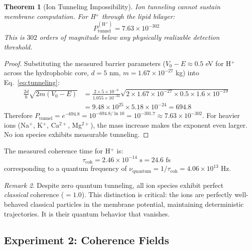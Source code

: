 \documentclass[twocolumn,10pt,a4paper]{article}
\newtheorem{theorem}{Theorem}[section]
\theoremstyle{definition}
\theoremstyle{remark}
\newtheorem{remark}[theorem]{Remark}
\begin{document}
\begin{theorem}[Ion Tunneling Impossibility]
\label{thm:tunneling}
Ion tunneling cannot sustain membrane computation. For H$^+$ through the lipid bilayer:
\begin{equation}
\label{eq:tunneling_result}
P_{\mathrm{tunnel}}^{(\mathrm{H}^+)} = 7.63 \times 10^{-302}
\end{equation}
This is $302$ orders of magnitude below any physically realizable detection threshold.
\end{theorem}

\begin{proof}
Substituting the measured barrier parameters ($V_0 - E \approx 0.5$ eV for H$^+$ across the hydrophobic core, $d = 5$ nm, $m = 1.67 \times 10^{-27}$ kg) into Eq.~\eqref{eq:tunneling}:
\begin{align}
\frac{2d}{\hbar}\sqrt{2m(V_0 - E)} &= \frac{2 \times 5 \times 10^{-9}}{1.055 \times 10^{-34}} \sqrt{2 \times 1.67 \times 10^{-27} \times 0.5 \times 1.6 \times 10^{-19}} \nonumber \\
&= 9.48 \times 10^{25} \times 5.18 \times 10^{-24} = 694.8 \label{eq:tunneling_exponent}
\end{align}
Therefore $P_{\mathrm{tunnel}} = e^{-694.8} = 10^{-694.8/\ln 10} = 10^{-301.7} \approx 7.63 \times 10^{-302}$. For heavier ions (Na$^+$, K$^+$, Ca$^{2+}$, Mg$^{2+}$), the mass increase makes the exponent even larger. No ion species exhibits measurable tunneling. \qedhere
\end{proof}

The measured coherence time for H$^+$ is:
\begin{equation}
\label{eq:coherence_time}
\tau_{\mathrm{coh}} = 2.46 \times 10^{-14} \text{ s} = 24.6 \text{ fs}
\end{equation}
corresponding to a quantum frequency of $\nu_{\mathrm{quantum}} = 1/\tau_{\mathrm{coh}} = 4.06 \times 10^{13}$ Hz.

\begin{remark}
\label{rem:classical_coherence}
Despite zero quantum tunneling, all ion species exhibit perfect \emph{classical} coherence ($= 1.0$). This distinction is critical: the ions are perfectly well-behaved classical particles in the membrane potential, maintaining deterministic trajectories. It is their quantum behavior that vanishes.
\end{remark}

\subsection{Experiment 2: Coherence Fields}
\end{document}
